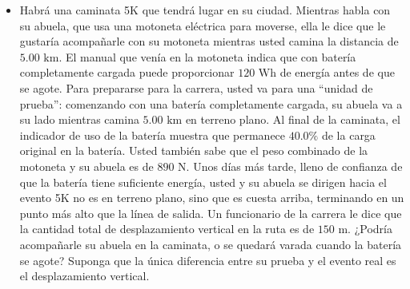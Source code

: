 \documentclass[11pt,a4paper]{article}
\begin{document}
\begin{itemize}
    \item[\textbf{20.}] Habrá una caminata 5K que tendrá lugar en su ciudad. Mientras habla con su abuela, que usa una motoneta eléctrica para moverse, ella le dice que le gustaría acompañarle con su motoneta mientras usted camina la distancia de $5.00 \text{ km}$. El manual que venía en la motoneta indica que con batería completamente cargada puede proporcionar $120 \text{ Wh}$ de energía antes de que se agote. Para prepararse para la carrera, usted va para una ``unidad de prueba'': comenzando con una batería completamente cargada, su abuela va a su lado mientras camina $5.00 \text{ km}$ en terreno plano. Al final de la caminata, el indicador de uso de la batería muestra que permanece $40.0\%$ de la carga original en la batería. Usted también sabe que el peso combinado de la motoneta y su abuela es de $890 \text{ N}$. Unos días más tarde, lleno de confianza de que la batería tiene suficiente energía, usted y su abuela se dirigen hacia el evento 5K no es en terreno plano, sino que es cuesta arriba, terminando en un punto más alto que la línea de salida. Un funcionario de la carrera le dice que la cantidad total de desplazamiento vertical en la ruta es de $150 \text{ m}$. ¿Podría acompañarle su abuela en la caminata, o se quedará varada cuando la batería se agote? Suponga que la única diferencia entre su prueba y el evento real es el desplazamiento vertical.
    \vspace*{7cm}
\end{itemize}

\newpage
\end{document}
